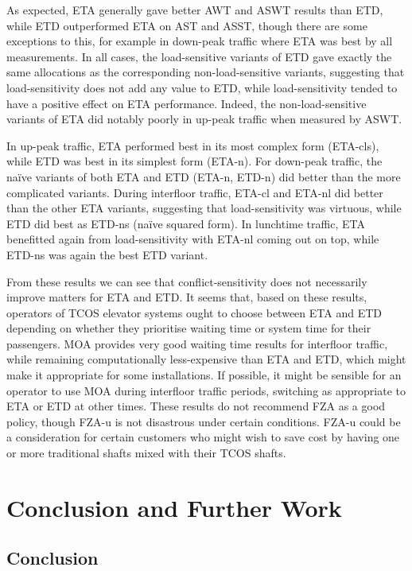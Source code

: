 \documentclass{UoYCSproject}
\begin{document}
As expected, ETA generally gave better AWT and ASWT results than ETD, while ETD outperformed ETA on AST and ASST, though there are some exceptions to this, for example in down-peak traffic where ETA was best by all measurements.  In all cases, the load-sensitive variants of ETD gave exactly the same allocations as the corresponding non-load-sensitive variants, suggesting that load-sensitivity does not add any value to ETD, while load-sensitivity tended to have a positive effect on ETA performance.  Indeed, the non-load-sensitive variants of ETA did notably poorly in up-peak traffic when measured by ASWT.

In up-peak traffic, ETA performed best in its most complex form (ETA-cls), while ETD was best in its simplest form (ETA-n).  For down-peak traffic, the na\"{i}ve variants of both ETA and ETD (ETA-n, ETD-n) did better than the more complicated variants.  During interfloor traffic, ETA-cl and ETA-nl did better than the other ETA variants, suggesting that load-sensitivity was virtuous, while ETD did best as ETD-ns (na\"{i}ve squared form).  In lunchtime traffic, ETA benefitted again from load-sensitivity with ETA-nl coming out on top, while ETD-ns was again the best ETD variant.

From these results we can see that conflict-sensitivity does not necessarily improve matters for ETA and ETD.  It seems that, based on these results, operators of TCOS elevator systems ought to choose between ETA and ETD depending on whether they prioritise waiting time or system time for their passengers.  MOA provides very good waiting time results for interfloor traffic, while remaining computationally less-expensive than ETA and ETD, which might make it appropriate for some installations.  If possible, it might be sensible for an operator to use MOA during interfloor traffic periods, switching as appropriate to ETA or ETD at other times.  These results do not recommend FZA as a good policy, though FZA-u is not disastrous under certain conditions.  FZA-u could be a consideration for certain customers who might wish to save cost by having one or more traditional shafts mixed with their TCOS shafts.

\chapter{Conclusion and Further Work}

\section{Conclusion}
\end{document}

